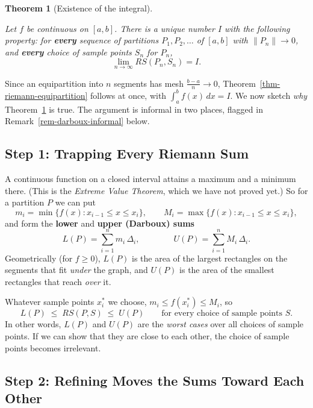 \documentclass[
  letterpaper,
  DIV=11,
  numbers=noendperiod]{scrreprt}
\theoremstyle{plain}
\theoremstyle{plain}
\theoremstyle{definition}
\theoremstyle{definition}
\theoremstyle{definition}
\theoremstyle{plain}
\newtheorem{theorem}{Theorem}[chapter]
\theoremstyle{plain}
\theoremstyle{remark}
\begin{document}
\begin{theorem}[Existence of the
integral]\protect\hypertarget{thm-riemann-general}{}\label{thm-riemann-general}

Let \(f\) be continuous on \([a,b]\). There is a unique number \(I\)
with the following property: for \textbf{every} sequence of partitions
\(P_1,P_2,\ldots\) of \([a,b]\) with \(\|P_n\|\to0\), and \textbf{every}
choice of sample points \(S_n\) for \(P_n\), \[
\lim_{n\to\infty} RS(P_n,S_n) = I.
\]

\end{theorem}

Since an equipartition into \(n\) segments has mesh
\(\tfrac{b-a}{n}\to0\), Theorem~\ref{thm-riemann-equipartition} follows
at once, with \(\int_a^b f(x)\,dx = I\). We now sketch \emph{why}
Theorem~\ref{thm-riemann-general} is true. The argument is informal in
two places, flagged in Remark~\ref{rem-darboux-informal} below.

\subsection{Step 1: Trapping Every Riemann
Sum}\label{step-1-trapping-every-riemann-sum}

A continuous function on a closed interval attains a maximum and a
minimum there. (This is the \emph{Extreme Value Theorem}, which we have
not proved yet.) So for a partition \(P\) we can put \[
m_i = \min\{f(x) : x_{i-1}\le x\le x_i\}, \qquad
M_i = \max\{f(x) : x_{i-1}\le x\le x_i\},
\] and form the \textbf{lower} and \textbf{upper (Darboux) sums} \[
L(P) = \sum_{i=1}^n m_i\,\Delta_i, \qquad\qquad U(P) = \sum_{i=1}^n M_i\,\Delta_i.
\] Geometrically (for \(f\ge0\)), \(L(P)\) is the area of the largest
rectangles on the segments that fit \emph{under} the graph, and \(U(P)\)
is the area of the smallest rectangles that reach \emph{over} it.

Whatever sample points \(x_i^*\) we choose, \(m_i\le f(x_i^*)\le M_i\),
so \[
L(P) \;\le\; RS(P,S) \;\le\; U(P) \qquad\text{for every choice of sample points } S.
\] In other words, \(L(P)\) and \(U(P)\) are the \emph{worst cases} over
all choices of sample points. If we can show that they are close to each
other, the choice of sample points becomes irrelevant.

\subsection{Step 2: Refining Moves the Sums Toward Each
Other}\label{step-2-refining-moves-the-sums-toward-each-other}
\end{document}
